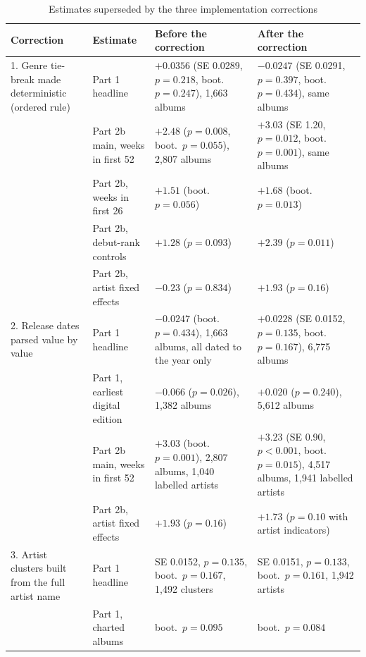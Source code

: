 \begin{table}[h]
\caption{Estimates superseded by the three implementation corrections}
\label{tab:S_superseded}
\footnotesize
\begin{tabular}{@{}p{3.1cm}p{3.0cm}p{3.6cm}p{3.6cm}@{}}
\toprule
Correction & Estimate & Before the correction & After the correction \\
\midrule
1. Genre tie-break made deterministic (ordered rule) & Part 1 headline & $+0.0356$ (SE 0.0289, $p=0.218$, boot.\ $p=0.247$), 1,663 albums & $-0.0247$ (SE 0.0291, $p=0.397$, boot.\ $p=0.434$), same albums \\
 & Part 2b main, weeks in first 52 & $+2.48$ ($p=0.008$, boot.\ $p=0.055$), 2,807 albums & $+3.03$ (SE 1.20, $p=0.012$, boot.\ $p=0.001$), same albums \\
 & Part 2b, weeks in first 26 & $+1.51$ (boot.\ $p=0.056$) & $+1.68$ (boot.\ $p=0.013$) \\
 & Part 2b, debut-rank controls & $+1.28$ ($p=0.093$) & $+2.39$ ($p=0.011$) \\
 & Part 2b, artist fixed effects & $-0.23$ ($p=0.834$) & $+1.93$ ($p=0.16$) \\
\midrule
2. Release dates parsed value by value & Part 1 headline & $-0.0247$ (boot.\ $p=0.434$), 1,663 albums, all dated to the year only & $+0.0228$ (SE 0.0152, $p=0.135$, boot.\ $p=0.167$), 6,775 albums \\
 & Part 1, earliest digital edition & $-0.066$ ($p=0.026$), 1,382 albums & $+0.020$ ($p=0.240$), 5,612 albums \\
 & Part 2b main, weeks in first 52 & $+3.03$ (boot.\ $p=0.001$), 2,807 albums, 1,040 labelled artists & $+3.23$ (SE 0.90, $p<0.001$, boot.\ $p=0.015$), 4,517 albums, 1,941 labelled artists \\
 & Part 2b, artist fixed effects & $+1.93$ ($p=0.16$) & $+1.73$ ($p=0.10$ with artist indicators) \\
\midrule
3. Artist clusters built from the full artist name & Part 1 headline & SE 0.0152, $p=0.135$, boot.\ $p=0.167$, 1,492 clusters & SE 0.0151, $p=0.133$, boot.\ $p=0.161$, 1,942 artists \\
 & Part 1, charted albums & boot.\ $p=0.095$ & boot.\ $p=0.084$ \\

\end{tabular}
\end{table}
